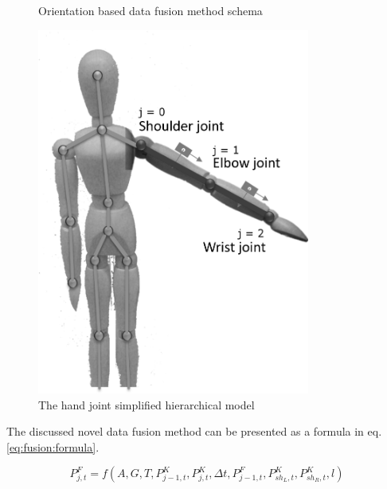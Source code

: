 \documentclass[sensors,article,submit,moreauthors,pdftex,10pt,a4paper]{mdpi}
\begin{document}
	\begin{minipage}{\linewidth}
      \centering
      \begin{minipage}[b]{0.45\linewidth}
          \begin{figure}[H]
            	\scalebox{0.5}{
				
			}
			\caption{Orientation based data fusion method schema}
			\label{fig:methodPhases}
          \end{figure}
      \end{minipage}
      	\hfill
      \begin{minipage}[b]{0.45\linewidth}
          \begin{figure}[H]
            \includegraphics[width=0.8\textwidth]{Figure11.png}
			\caption{The hand joint simplified hierarchical model}		
			\label{fig:hybrid:jointsHierarchy}	
          \end{figure}
      \end{minipage}
  \end{minipage}
	
	The discussed novel data fusion method can be presented as a formula in eq. \ref{eq:fusion:formula}.
	
	\begin{equation}
		P^F_{j,t} = f(A,G,T,P_{j-1,t}^K,P_{j,t}^K,\Delta t, P^F_{j-1,t}, P^K_{sh_L,t},P^K_{sh_R,t},l) 
		\label{eq:fusion:formula}
	\end{equation}
	
\end{document}
